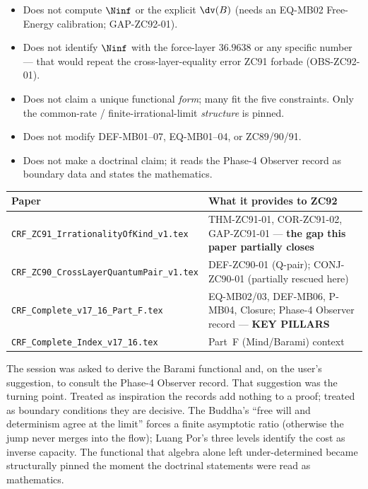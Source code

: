 \documentclass[12pt, a4paper]{article}
\begin{document}
\begin{keybox}[title={What ZC92 Does NOT Do}]
\begin{itemize}[leftmargin=2em, noitemsep]
  \item Does not compute $\Ninf$ or the explicit $\dv(B)$ (needs an
    EQ-MB02 Free-Energy calibration; GAP-ZC92-01).
  \item Does not identify $\Ninf$ with the force-layer $36.9638$ or any
    specific number --- that would repeat the cross-layer-equality error
    ZC91 forbade (OBS-ZC92-01).
  \item Does not claim a unique functional \emph{form}; many fit the five
    constraints. Only the common-rate / finite-irrational-limit
    \emph{structure} is pinned.
  \item Does not modify DEF-MB01--07, EQ-MB01--04, or ZC89/90/91.
  \item Does not make a doctrinal claim; it reads the Phase-4 Observer
    record as boundary data and states the mathematics.
\end{itemize}
\end{keybox}

\begin{keybox}[title={Companion Papers --- ZC92}]
{\footnotesize\renewcommand{\arraystretch}{1.3}
\begin{center}
\begin{tabular}{@{}p{6.1cm}p{6.4cm}@{}}
\toprule
\textbf{Paper} & \textbf{What it provides to ZC92} \\
\midrule
\texttt{CRF\_ZC91\_IrrationalityOfKind\_v1.tex}
  & THM-ZC91-01, COR-ZC91-02, GAP-ZC91-01 ---
    \textbf{the gap this paper partially closes} \\
\texttt{CRF\_ZC90\_CrossLayerQuantumPair\_v1.tex}
  & DEF-ZC90-01 (Q-pair); CONJ-ZC90-01 (partially rescued here) \\
\texttt{CRF\_Complete\_v17\_16\_Part\_F.tex}
  & EQ-MB02/03, DEF-MB06, P-MB04, Closure; Phase-4 Observer record ---
    \textbf{KEY PILLARS} \\
\texttt{CRF\_Complete\_Index\_v17\_16.tex}
  & Part~F (Mind/Barami) context \\
\bottomrule
\end{tabular}
\end{center}}
\end{keybox}

\begin{derivedbox}[title={Discovery Note}]
The session was asked to derive the Barami functional and, on the user's
suggestion, to consult the Phase-4 Observer record. That suggestion was
the turning point. Treated as inspiration the records add nothing to a
proof; treated as boundary conditions they are decisive. The Buddha's
``free will and determinism agree at the limit'' forces a finite
asymptotic ratio (otherwise the jump never merges into the flow); Luang
Por's three levels identify the cost as inverse capacity. The functional
that algebra alone left under-determined became structurally pinned the
moment the doctrinal statements were read as mathematics.
\end{derivedbox}
\end{document}
